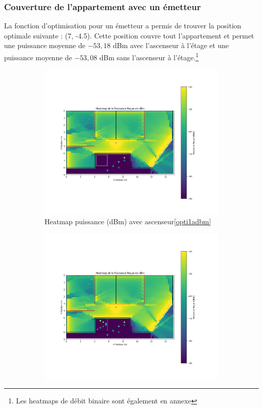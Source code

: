 \subsubsection{Couverture de l'appartement avec un émetteur}
La fonction d'optimisation pour un émetteur a permis de trouver la position optimale suivante : (7, -4.5). Cette position couvre tout l'appartement et permet une puissance moyenne de $-53,18$ dBm avec l'ascenseur à l'étage et une puissance moyenne de $-53,08$ dBm sans l'ascenseur à l'étage.\footnote{Les heatmaps de débit binaire sont également en annexe}

\begin{figure}[H]
\centering
\begin{subfigure}[b]{0.48\textwidth}
    \centering
    \includegraphics[width=\textwidth]{Pictures/opt1bpma.png}
    \caption{Heatmap puissance (dBm) avec ascenseur\ref{opti1adbm}}
    \label{fig:}
\end{subfigure}
\hfill
\begin{subfigure}[b]{0.48\textwidth}
    \centering
    \includegraphics[width=\textwidth]{Pictures/opt1bpm.png}

\end{subfigure}
\end{figure}
